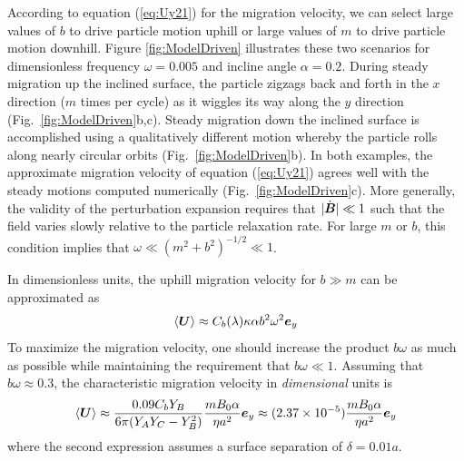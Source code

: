According to equation (\ref{eq:Uy21}) for the migration velocity, we can select large values of $b$ to drive particle motion uphill or large values of $m$ to drive particle motion downhill.  Figure \ref{fig:ModelDriven} illustrates these two scenarios for dimensionless frequency $\omega=0.005$ and incline angle $\alpha=0.2$.  During steady migration up the inclined surface, the particle zigzags back and forth in the $x$ direction ($m$ times per cycle) as it wiggles its way along the $y$ direction (Fig.~\ref{fig:ModelDriven}b,c). Steady migration down the inclined surface is accomplished using a qualitatively different motion whereby the particle rolls along nearly circular orbits (Fig.~\ref{fig:ModelDriven}b). In both examples, the approximate migration velocity of equation (\ref{eq:Uy21}) agrees well with the steady motions computed numerically (Fig.~\ref{fig:ModelDriven}c).  More generally, the validity of the perturbation expansion requires that $|\dot{\boldsymbol{B}}| \ll 1$ such that the field varies slowly relative to the particle relaxation rate. For large $m$ or $b$, this condition implies that $\omega\ll (m^2+b^2)^{-1/2} \ll 1$.

In dimensionless units, the uphill migration velocity for $b\gg m$ can be approximated as 
\begin{equation}
    \langle \boldsymbol{U} \rangle \approx C_b(\lambda) \kappa \alpha b^2\omega^2 \boldsymbol{e}_y 
\end{equation}
To maximize the migration velocity, one should increase the product $b\omega$ as much as possible while maintaining the requirement that $b\omega \ll 1$.  Assuming that $b\omega\approx 0.3$, the characteristic migration velocity in \emph{dimensional} units is
\begin{equation}
    \langle \boldsymbol{U} \rangle \approx \frac{0.09 C_b Y_B}{6\pi (Y_A Y_C-Y_B^2)} \frac{m B_0\alpha}{\eta a^2} \boldsymbol{e}_y \approx (2.37\times10^{-5}) \frac{m B_0 \alpha}{\eta a^2}  \boldsymbol{e}_y
\end{equation}
where the second expression assumes a surface separation of $\delta=0.01a$. 


